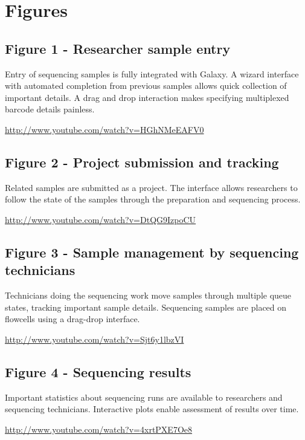 \documentclass[10pt]{bmc_article}
\newenvironment{bmcformat}{\begin{raggedright}\baselineskip20pt\sloppy\setboolean{publ}{false}}{\end{raggedright}\baselineskip20pt\sloppy}
\begin{document}
\begin{bmcformat}
{
   }  %


\section*{Figures}
\subsection*{Figure 1 - Researcher sample entry}
Entry of sequencing samples is fully integrated with Galaxy. A
wizard interface with automated completion from previous samples
allows quick collection of important details. A drag and drop
interaction makes specifying multiplexed barcode details painless.

\url{http://www.youtube.com/watch?v=HGhNMeEAFV0}

\subsection*{Figure 2 - Project submission and tracking}
Related samples are submitted as a project. The interface allows
researchers to follow the state of the samples through the
preparation and sequencing process.

\url{http://www.youtube.com/watch?v=DtQG9IzpoCU}

\subsection*{Figure 3 - Sample management by sequencing technicians}
Technicians doing the sequencing work move samples through multiple
queue states, tracking important sample details. Sequencing samples
are placed on flowcells using a drag-drop interface.

\url{http://www.youtube.com/watch?v=Sjt6y1lbzVI}

\subsection*{Figure 4 - Sequencing results}
Important statistics about sequencing runs are available to
researchers and sequencing technicians. Interactive plots enable
assessment of results over time.

\url{http://www.youtube.com/watch?v=4xrtPXE7Oe8}


\end{bmcformat}
\end{document}

